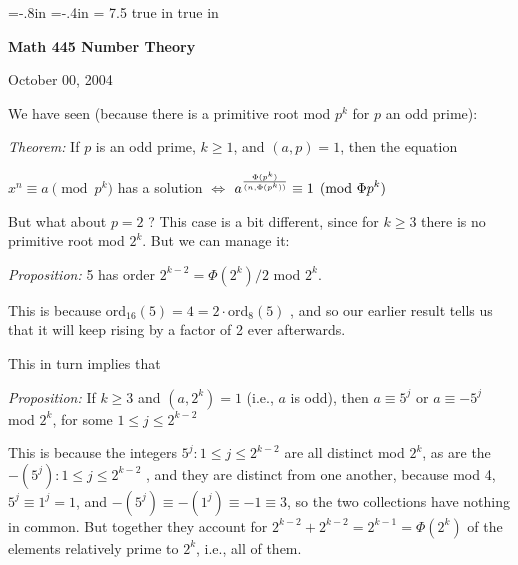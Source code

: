 





\loadmsbm

\nopagenumbers
\parindent=0pt

\voffset=-.8in
\hoffset=-.4in
\hsize = 7.5 true in
 true in


\overfullrule=0pt


\def\ctln{\centerline}
\def\u{\underbar}
\def\ssk{\smallskip}
\def\msk{\medskip}
\def\bsk{\bigskip}
\def\hsk{\hskip.1in}
\def\hhsk{\hskip.2in}

\def\lra{$\Leftrightarrow$ }


\ctln{\bf Math 445 Number Theory}

\smallskip

\ctln{October 00, 2004}

\medskip

We have seen (because there is a primitive root mod $p^k$ for $p$ an odd prime):

\msk

{\it Theorem:} If $p$ is an odd prime, $k\geq 1$, and $(a,p)=1$, then the equation

\ssk

\hfill$x^n\equiv a\pmod{p^k}$ has  a solution $\Leftrightarrow$ $\displaystyle a^{{\Phi(p^k)}\over{(n,\Phi(p^k))}}\equiv 1\pmod{\Phi{p^k}}$

\msk

But what about $p=2$ ? This case is a bit different, since for $k\geq 3$ there is no primitive root mod $2^k$.
But we can  manage it: 

\ssk

{\it Proposition:} 5 has order $2^{k-2} = \Phi(2^k)/2$ mod $2^k$.

\ssk

This is because ord$_{16}(5) = 4 = 2\cdot$ord$_8(5)$ , and so our earlier result tells us that it will 
keep rising by a factor of 2 ever afterwards.

\ssk

This in turn implies that

\ssk

{\it Proposition:} If $k\geq 3$ and $(a,2^k)=1$ (i.e., $a$ is odd), then 
$a\equiv 5^j$ or $a\equiv -5^j$  mod $2^k$, for some $1\leq j\leq 2^{k-2}$

\ssk

This is because the integers $ 5^j : 1\leq j\leq 2^{k-2}$ are all distinct mod $2^k$, as are
the $ -(5^j) : 1\leq j\leq 2^{k-2}$ , and they are distinct from one another, because mod 4,
$5^j\equiv 1^j=1$, and $-(5^j)\equiv -(1^j)\equiv -1\equiv 3$, so the two collections have
nothing in common. But together they account for $2^{k-2}+2^{k-2} = 2^{k-1} = \Phi(2^k)$
of the elements relatively prime to $2^k$, i.e., all of them.

